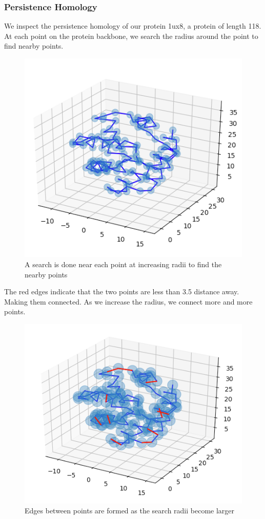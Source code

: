 \documentclass[12pt, a4paper, twocolumn, fullpage]{article}
\theoremstyle{plain}
\theoremstyle{definition}
\theoremstyle{remark}
\begin{document}
\subsubsection{Persistence Homology}

We inspect the persistence homology of our protein 1ux8, a protein of length 118. At each point on the protein backbone, we search the radius around the point to find nearby points.

\begin{figure}[t]
    \includegraphics[width=\linewidth]{img/hom/ballRad1.png}
    \caption{A search is done near each point at increasing radii to find the nearby points }
    \label{ballRad1}
\end{figure}
The red edges indicate that the two points are less than 3.5 distance away. Making them connected.
As we increase the radius, we connect more and more points.
\begin{figure}[t]
    \includegraphics[width=\linewidth]{img/hom/ballRad2.png}
    \caption{Edges between points are formed as the search radii become larger}
    \label{ballRad2}
\end{figure}
\end{document}
